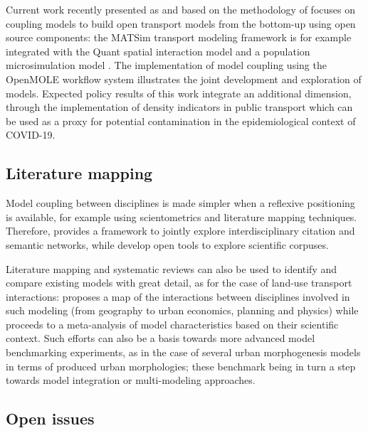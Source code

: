 Current work recently presented as \cite{raimbault2021estimating} and based on the methodology of \cite{raimbault2021building} focuses on coupling models to build open transport models from the bottom-up using open source components: the MATSim transport modeling framework \cite{horni2016multi} is for example integrated with the Quant spatial interaction model \cite{batty2021new} and a population microsimulation model \cite{lomax2017microsimulation}. The implementation of model coupling using the OpenMOLE workflow system \cite{passerat2017reproducible} illustrates the joint development and exploration of models. Expected policy results of this work integrate an additional dimension, through the implementation of density indicators in public transport which can be used as a proxy for potential contamination in the epidemiological context of COVID-19.



\subsection{Literature mapping}

Model coupling between disciplines is made simpler when a reflexive positioning is available, for example using scientometrics and literature mapping techniques. Therefore, \cite{raimbault2019exploration} provides a framework to jointly explore interdisciplinary citation and semantic networks, while \cite{raimbault2021empowering} develop open tools to explore scientific corpuses. 

Literature mapping and systematic reviews can also be used to identify and compare existing models with great detail, as for the case of land-use transport interactions: \cite{raimbault2021interdisciplinary} proposes a map of the interactions between disciplines involved in such modeling (from geography to urban economics, planning and physics) while \cite{raimbault2019meta} proceeds to a meta-analysis of model characteristics based on their scientific context. Such efforts can also be a basis towards more advanced model benchmarking experiments, as \cite{raimbault2020comparison} in the case of several urban morphogenesis models in terms of produced urban morphologies; these benchmark being in turn a step towards model integration or multi-modeling approaches.

\subsection{Open issues}


